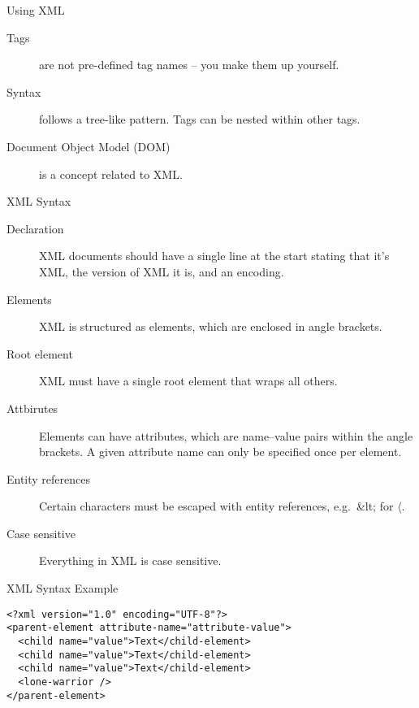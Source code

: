 \begin{frame}{Using XML}
  \begin{description}
    \item[Tags] are not pre-defined tag names -- you make them up yourself.
    \item[Syntax] follows a tree-like pattern. Tags can be nested within other tags.
    \item[Document Object Model (DOM)] is a concept related to XML.
  \end{description}
\end{frame}


\begin{frame}{XML Syntax}
  \begin{description}
    \item[Declaration] XML documents should have a single line at the start stating that it's XML, the version of XML it is, and an encoding.
    \item[Elements] XML is structured as elements, which are enclosed in angle brackets.
    \item[Root element] XML must have a single root element that wraps all others.
    \item[Attbirutes] Elements can have attributes, which are name--value pairs within the angle brackets. A given attribute name can only be specified once per element.
    \item[Entity references] Certain characters must be escaped with entity references, e.g.\ \&lt; for $\langle$.
    \item[Case sensitive] Everything in XML is case sensitive.
  \end{description}
\end{frame}

\begin{frame}[fragile]{XML Syntax Example}
  \begin{verbatim}
<?xml version="1.0" encoding="UTF-8"?>
<parent-element attribute-name="attribute-value">
  <child name="value">Text</child-element>
  <child name="value">Text</child-element>
  <child name="value">Text</child-element>
  <lone-warrior />
</parent-element>
  \end{verbatim}
\end{frame}

